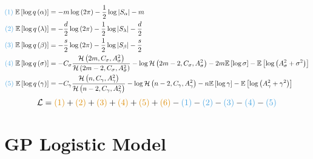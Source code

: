 \documentclass[11pt]{article}
\begin{document}
\begin{align*}
  \textcolor{myblue}{(1)}\;\mathbb{E}\left[\log q\left(\alpha\right)\right] &= -m\log \left(2\pi \right) -\frac{1}{2}\log \left|S_{\alpha}\right| -m\\
  \textcolor{myblue}{(2)}\;\mathbb{E}\left[\log q\left(\lambda\right)\right] &= -\frac{d}{2}\log \left(2\pi \right) -\frac{1}{2}\log \left|S_{\lambda}\right| -\frac{d}{2}\\
  \textcolor{myblue}{(3)}\;\mathbb{E}\left[\log q\left(\beta\right)\right] &= -\frac{s}{2}\log \left(2\pi \right) -\frac{1}{2}\log \left|S_{\beta}\right| -\frac{s}{2}\\
  \textcolor{myblue}{(4)}\;\mathbb{E}\left[\log q\left(\sigma\right)\right] &= -C_{\sigma}\frac{\mathcal{H}\left(2m, C_{\sigma}, A_{\sigma}^{2}\right)}{\mathcal{H}\left(2m-2, C_{\sigma}, A_{\sigma}^{2}\right)} -\log \mathcal{H}\left(2m-2, C_{\sigma}, A_{\sigma}^{2}\right) -2m \mathbb{E}\left[\log \sigma\right] -\mathbb{E}\left[\log \left(A_{\sigma}^{2}+\sigma^{2}\right)\right]\\
  \textcolor{myblue}{(5)}\;\mathbb{E}\left[\log q\left(\gamma\right)\right] &= -C_{\gamma}\frac{\mathcal{H}\left(n, C_{\gamma}, A_{\gamma}^{2}\right)}{\mathcal{H}\left(n-2, C_{\gamma}, A_{\gamma}^{2}\right)} -\log \mathcal{H}\left(n-2, C_{\gamma}, A_{\gamma}^{2}\right) -n \mathbb{E}\left[\log \gamma\right] -\mathbb{E}\left[\log \left(A_{\gamma}^{2}+\gamma^{2}\right)\right]
\end{align*}
$$
  \mathcal{L} = \textcolor{myorange}{(1)} + \textcolor{myorange}{(2)} + \textcolor{myorange}{(3)} + \textcolor{myorange}{(4)} + \textcolor{myorange}{(5)} + \textcolor{myorange}{(6)} - \textcolor{myblue}{(1)} - \textcolor{myblue}{(2)} - \textcolor{myblue}{(3)} - \textcolor{myblue}{(4)} - \textcolor{myblue}{(5)}
$$
\section{GP Logistic Model}
\end{document}
